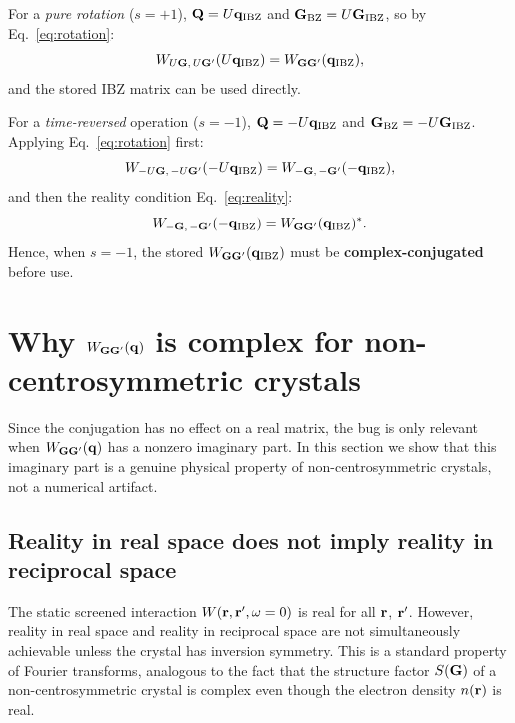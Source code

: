 \documentclass[11pt,a4paper]{article}
\begin{document}
For a \emph{pure rotation} ($s = +1$), $\vb{Q} = U\vb{q}_\text{IBZ}$
and $\vb{G}_\text{BZ} = U\vb{G}_\text{IBZ}$, so by
Eq.~\eqref{eq:rotation}:
\begin{equation}
  W_{U\vb{G},\,U\vb{G}'}(U\vb{q}_\text{IBZ})
  = W_{\vb{GG}'}(\vb{q}_\text{IBZ}),
\end{equation}
and the stored IBZ matrix can be used directly.

For a \emph{time-reversed} operation ($s = -1$),
$\vb{Q} = -U\vb{q}_\text{IBZ}$ and
$\vb{G}_\text{BZ} = -U\vb{G}_\text{IBZ}$.  Applying
Eq.~\eqref{eq:rotation} first:
\begin{equation}
  W_{-U\vb{G},\,-U\vb{G}'}(-U\vb{q}_\text{IBZ})
  = W_{-\vb{G},\,-\vb{G}'}(-\vb{q}_\text{IBZ}),
\end{equation}
and then the reality condition Eq.~\eqref{eq:reality}:
\begin{equation}\label{eq:conjugation}
  W_{-\vb{G},\,-\vb{G}'}(-\vb{q}_\text{IBZ})
  = W_{\vb{GG}'}(\vb{q}_\text{IBZ})^*.
\end{equation}
Hence, when $s = -1$, the stored $W_{\vb{GG}'}(\vb{q}_\text{IBZ})$
must be \textbf{complex-conjugated} before use.

\section{Why $W_{\vb{GG}'}(\vb{q})$ is complex for non-centrosymmetric
         crystals}
\label{sec:imW}

Since the conjugation has no effect on a real matrix, the bug is only
relevant when $W_{\vb{GG}'}(\vb{q})$ has a nonzero imaginary part.
In this section we show that this imaginary part is a genuine physical
property of non-centrosymmetric crystals, not a numerical artifact.

\subsection{Reality in real space does not imply reality in reciprocal
            space}

The static screened interaction $W(\vb{r}, \vb{r}', \omega = 0)$ is
real for all $\vb{r}$, $\vb{r}'$.  However, reality in real space and
reality in reciprocal space are not simultaneously achievable unless the
crystal has inversion symmetry.  This is a standard property of Fourier
transforms, analogous to the fact that the structure factor $S(\vb{G})$
of a non-centrosymmetric crystal is complex even though the electron
density $n(\vb{r})$ is real.
\end{document}
